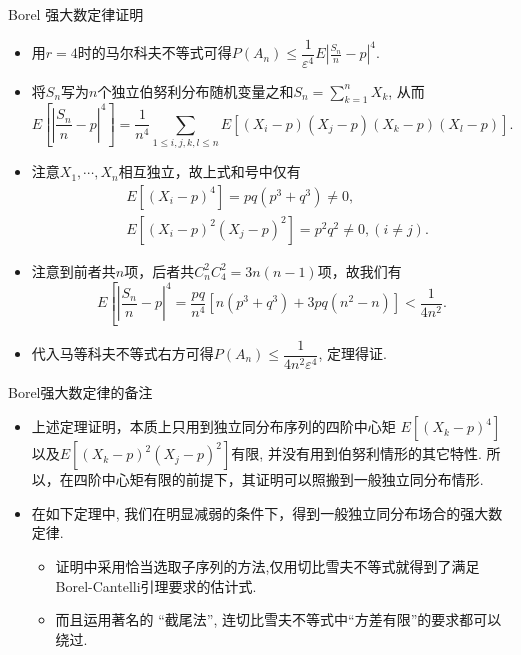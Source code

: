 \documentclass[Prob-All.tex]{subfiles}
\begin{document}
\begin{frame}{Borel 强大数定律证明}
\begin{itemize}[<+-|alert@+>]
\item 用${r=4}$时的马尔科夫不等式可得$P\left(A_{n}\right) \leq \dfrac{1}{\varepsilon^{4}} E\left|\frac{S_n}{n}-p\right|^{4}.$
\item 将${S_n}$写为${n}$个独立伯努利分布随机变量之和${S_n=\sum_{k=1}^{n} X_{k}}$, 从而
\[
E\left[\left|\frac{S_n}{n}-p\right|^{4}\right]=\frac{1}{n^{4}} \sum_{1 \leq i, j, k, l \leq n} E\left[\left(X_{i}-p\right)\left(X_{j}-p\right)\left(X_{k}-p\right)\left(X_{l}-p\right)\right] .
\]
\item 注意${X_{1}, \cdots, X_{n}}$相互独立，故上式和号中仅有
\begin{align*}
	&E\left[\left(X_{i}-p\right)^{4}\right]=p q\left(p^{3}+q^{3}\right)\neq 0,\\
	  &E\left[\left(X_{i}-p\right)^{2}\left(X_{j}-p\right)^{2}\right]=p^{2} q^{2}\neq 0, (i \neq j).
\end{align*}
\item 注意到前者共${n}$项，后者共$ C_n^2C_4^2=3 n(n-1)$项，故我们有%
\[
E\left[\left|\frac{S_n}{n}-p\right|^{4} =\frac{p q}{n^{4}}\left[n\left(p^{3}+q^{3}\right)+3 p q\left(n^{2}-n\right)\right]<\frac{1}{4 n^{2}} .\right.
\]
\item 代入马等科夫不等式右方可得$P\left(A_{n}\right) \leq \dfrac{1}{4 n^{2} \varepsilon^{4}}$, 定理得证.

\end{itemize}
\end{frame}


\begin{frame}{Borel强大数定律的备注}
  \begin{rmk}
	\begin{itemize}[<+-|alert@+>]
	\item 上述定理证明，本质上只用到独立同分布序列的四阶中心矩
	${E\left[\left(X_{k}-p\right)^{4}\right]}$以及${E\left[\left(X_{k}-p\right)^{2}\left(X_{j}-p\right)^{2}\right]}$有限, 并没有用到伯努利情形的其它特性. 所以，在四阶中心矩有限的前提下，其证明可以照搬到一般独立同分布情形.
	\item 在如下定理中, 我们在明显减弱的条件下，得到一般独立同分布场合的强大数定律.
	\begin{itemize}[<+-|alert@+>]
	\item 证明中采用恰当选取子序列的方法,仅用切比雪夫不等式就得到了满足Borel-Cantelli引理要求的估计式.
	\item 而且运用著名的 “截尾法”, 连切比雪夫不等式中“方差有限”的要求都可以绕过.
	\end{itemize}

	\end{itemize}


  \end{rmk}



\end{frame}
\end{document}
